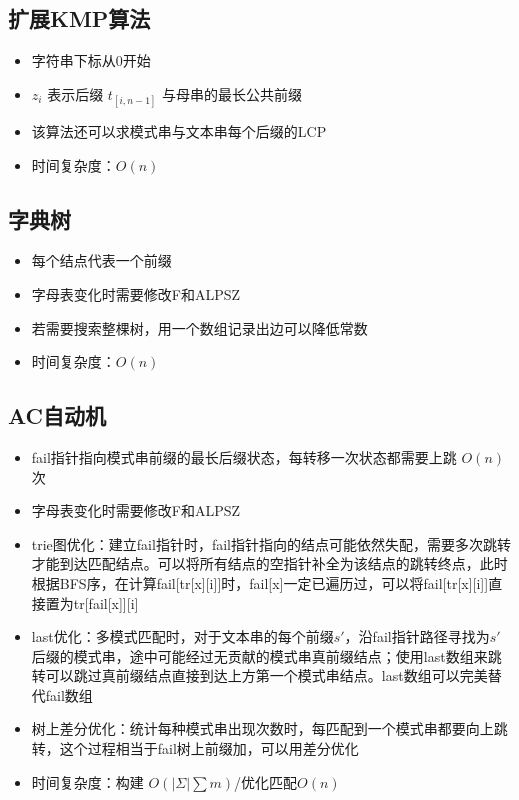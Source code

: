 \documentclass[twocolumn,a4,8pt]{article}  %
\begin{document}
		\subsection{扩展KMP算法}
	 		\noindent\begin{itemize}
		 		\item 字符串下标从0开始
		 		\item $z_i$ 表示后缀 $t_{[i,n-1]}$ 与母串的最长公共前缀
		 		\item 该算法还可以求模式串与文本串每个后缀的LCP
		 		\item 时间复杂度：$O(n)$
	 		\end{itemize}
	 	 	
	
	 	 \subsection{字典树}
	 		\noindent\begin{itemize}
		 		\item 每个结点代表一个前缀
		 		\item 字母表变化时需要修改F和ALPSZ
		 		\item 若需要搜索整棵树，用一个数组记录出边可以降低常数
		 		\item 时间复杂度：$O(n)$
	 		\end{itemize}
	 	 	
	 	 	
		\subsection{AC自动机}
	 		\noindent\begin{itemize}
	 			\item fail指针指向模式串前缀的最长后缀状态，每转移一次状态都需要上跳 $O(n)$ 次
		 		\item 字母表变化时需要修改F和ALPSZ
		 		\item trie图优化：建立fail指针时，fail指针指向的结点可能依然失配，需要多次跳转才能到达匹配结点。可以将所有结点的空指针补全为该结点的跳转终点，此时根据BFS序，在计算fail[tr[x][i]]时，fail[x]一定已遍历过，可以将fail[tr[x][i]]直接置为tr[fail[x]][i]
		 		\item last优化：多模式匹配时，对于文本串的每个前缀$s'$，沿fail指针路径寻找为$s'$后缀的模式串，途中可能经过无贡献的模式串真前缀结点；使用last数组来跳转可以跳过真前缀结点直接到达上方第一个模式串结点。last数组可以完美替代fail数组
		 		\item 树上差分优化：统计每种模式串出现次数时，每匹配到一个模式串都要向上跳转，这个过程相当于fail树上前缀加，可以用差分优化
		 		\item 时间复杂度：构建 $O(|\Sigma|\sum m)$/优化匹配$O(n)$
	 		\end{itemize}
	 	 	
	 	 	
\end{document}
